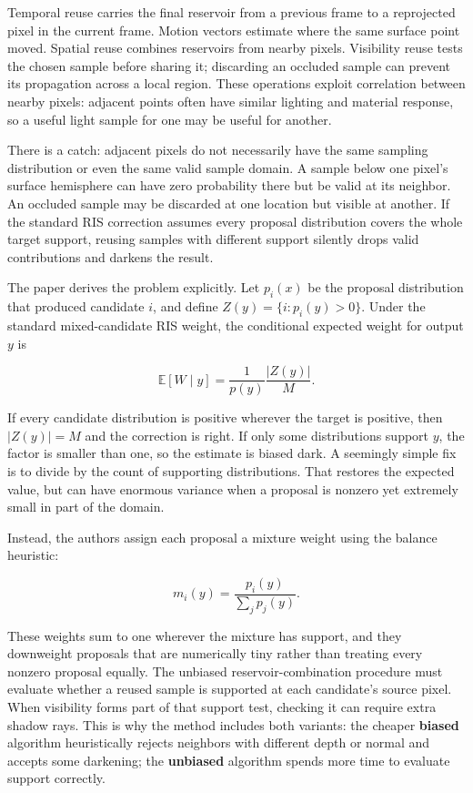 Temporal reuse carries the final reservoir from a previous frame to a reprojected pixel in the current frame. Motion vectors estimate where the same surface point moved. Spatial reuse combines reservoirs from nearby pixels. Visibility reuse tests the chosen sample before sharing it; discarding an occluded sample can prevent its propagation across a local region. These operations exploit correlation between nearby pixels: adjacent points often have similar lighting and material response, so a useful light sample for one may be useful for another.

There is a catch: adjacent pixels do not necessarily have the same sampling distribution or even the same valid sample domain. A sample below one pixel's surface hemisphere can have zero probability there but be valid at its neighbor. An occluded sample may be discarded at one location but visible at another. If the standard RIS correction assumes every proposal distribution covers the whole target support, reusing samples with different support silently drops valid contributions and darkens the result.

The paper derives the problem explicitly. Let \(p_i(x)\) be the proposal distribution that produced candidate \(i\), and define \(Z(y)=\{i:p_i(y)>0\}\). Under the standard mixed-candidate RIS weight, the conditional expected weight for output \(y\) is

\[\mathbb{E}[W\mid y]=\frac{1}{p(y)}\frac{|Z(y)|}{M}.\]

If every candidate distribution is positive wherever the target is positive, then \(|Z(y)|=M\) and the correction is right. If only some distributions support \(y\), the factor is smaller than one, so the estimate is biased dark. A seemingly simple fix is to divide by the count of supporting distributions. That restores the expected value, but can have enormous variance when a proposal is nonzero yet extremely small in part of the domain.

Instead, the authors assign each proposal a mixture weight using the balance heuristic:

\[m_i(y)=\frac{p_i(y)}{\sum_j p_j(y)}.\]

These weights sum to one wherever the mixture has support, and they downweight proposals that are numerically tiny rather than treating every nonzero proposal equally. The unbiased reservoir-combination procedure must evaluate whether a reused sample is supported at each candidate's source pixel. When visibility forms part of that support test, checking it can require extra shadow rays. This is why the method includes both variants: the cheaper \textbf{biased} algorithm heuristically rejects neighbors with different depth or normal and accepts some darkening; the \textbf{unbiased} algorithm spends more time to evaluate support correctly.

